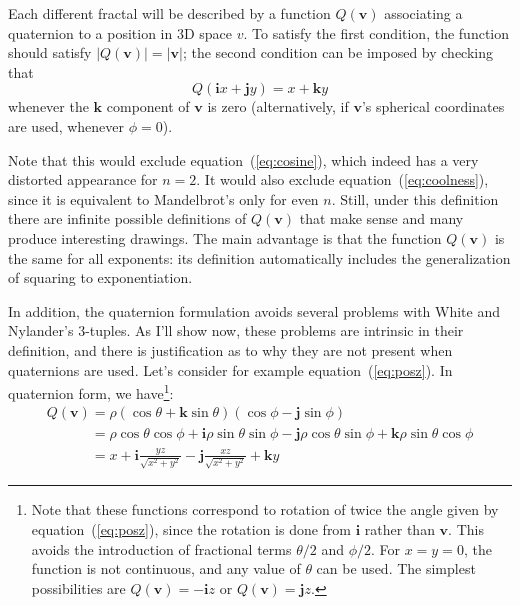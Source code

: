 \documentclass{article}
\let\vec\mathbf
\newcommand{\mathnewline}[1][\quad]{\\\phantom{#1}}
\begin{document}
Each different fractal will be described by a function $Q(\vec{v})$
associating a quaternion to a position in 3D space $v$.  To satisfy
the first condition, the function should satisfy $|Q(\vec{v})| =
|\vec{v}|$; the second condition can be imposed by checking that
\begin{equation*}
\label{eq:its-mandel}
 Q(\vec{i}x+\vec{j}y) = x+\vec{k}y
\end{equation*}
\noindent
whenever the $\vec{k}$ component of $\vec{v}$ is zero (alternatively,
if $\vec{v}$'s spherical coordinates are used, whenever $\phi = 0$).

Note that this would exclude equation~(\ref{eq:cosine}), which indeed
has a very distorted appearance for $n=2$.  It would also exclude
equation~(\ref{eq:coolness}), since it is equivalent to Mandelbrot's
only for even $n$.  Still, under this definition there are infinite
possible definitions of $Q(\vec{v})$ that make sense and many produce
interesting drawings.  The main advantage is that the function
$Q(\vec{v})$ is the same for all exponents: its definition
automatically includes the generalization of squaring to
exponentiation.

In addition, the quaternion formulation avoids several problems with
White and Nylander's 3-tuples.  As I'll show now, these problems are
intrinsic in their definition, and there is justification as to why
they are not present when quaternions are used.  Let's consider for
example equation~(\ref{eq:posz}).  In quaternion form, we
have\footnote{Note that these functions correspond to rotation of
  twice the angle given by equation~(\ref{eq:posz}), since the
  rotation is done from $\vec{i}$ rather than $\vec{v}$.  This avoids
  the introduction of fractional terms $\theta/2$ and $\phi/2$.
  For $x=y=0$, the function is not continuous, and any value
  of $\theta$ can be used.  The simplest possibilities are
  $Q(\vec{v}) = -\vec{i}z$ or $Q(\vec{v}) = \vec{j}z$.}:
\begin{equation}
  \label{eq:posz-q}
  \begin{array}{l}
  Q(\vec{v}) = \rho (\cos \theta + \vec{k} \sin \theta) (\cos \phi - \vec{j} \sin \phi)
  \mathnewline[Q(\vec{v})] = \rho \cos \theta \cos \phi + \vec{i} \rho \sin \theta \sin \phi - \vec{j} \rho \cos \theta \sin \phi + \vec{k} \rho \sin \theta \cos \phi
  \mathnewline[Q(\vec{v})] = x + \vec{i}\frac{y z}{\sqrt{x^2 + y^2}} - \vec{j}\frac{x z}{\sqrt{x^2 + y^2}} + \vec{k} y
\end{array}
\end{equation}
\end{document}
